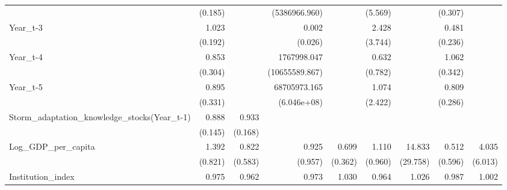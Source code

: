 \begin{table}[htbp]
\begin{tabular}{l*{8}{D{.}{.}{-1}}}
            &     (0.185)         &                     &(5386966.960)         &                     &     (5.569)         &                     &     (0.307)         &                     \\
Year\_t-3    &       1.023         &                     &       0.002         &                     &       2.428         &                     &       0.481         &                     \\
            &     (0.192)         &                     &     (0.026)         &                     &     (3.744)         &                     &     (0.236)         &                     \\
Year\_t-4    &       0.853         &                     & 1767998.047\sym{**} &                     &       0.632         &                     &       1.062         &                     \\
            &     (0.304)         &                     &(10655589.867)         &                     &     (0.782)         &                     &     (0.342)         &                     \\
Year\_t-5    &       0.895         &                     &68705973.165\sym{**} &                     &       1.074         &                     &       0.809         &                     \\
            &     (0.331)         &                     & (6.046e+08)         &                     &     (2.422)         &                     &     (0.286)         &                     \\
Storm\_adaptation\_knowledge\_stocks(Year\_t-1)&       0.888         &       0.933         &                     &                     &                     &                     &                     &                     \\
            &     (0.145)         &     (0.168)         &                     &                     &                     &                     &                     &                     \\
Log\_GDP\_per\_capita&       1.392         &       0.822         &       0.925         &       0.699         &       1.110         &      14.833         &       0.512         &       4.035         \\
            &     (0.821)         &     (0.583)         &     (0.957)         &     (0.362)         &     (0.960)         &    (29.758)         &     (0.596)         &     (6.013)         \\
Institution\_index&       0.975         &       0.962\sym{*}  &       0.973         &       1.030         &       0.964         &       1.026         &       0.987         &       1.002         \\

\end{tabular}
\end{table}
